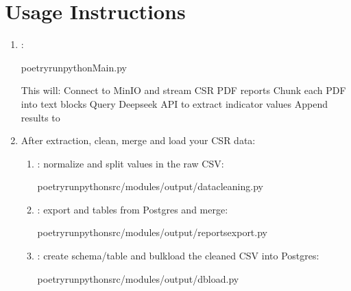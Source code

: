 \documentclass[letterpaper,10pt,english]{sphinxmanual}
\begin{document}
\sphinxstepscope


\chapter{Usage Instructions}
\label{\detokenize{usage_instructions:usage-instructions}}\label{\detokenize{usage_instructions::doc}}\begin{enumerate}
%
\item {} 
\sphinxAtStartPar
{}:

\begin{sphinxVerbatim}[commandchars=\\\{\}]
poetryrunpythonMain.py
\end{sphinxVerbatim}

\sphinxAtStartPar
This will:
\sphinxhyphen{} Connect to MinIO and stream CSR PDF reports
\sphinxhyphen{} Chunk each PDF into text blocks
\sphinxhyphen{} Query Deepseek API to extract indicator values
\sphinxhyphen{} Append results to 

\item {} 
\sphinxAtStartPar
{}

\sphinxAtStartPar
After extraction, clean, merge and load your CSR data:
\begin{enumerate}
%
\item {} 
\sphinxAtStartPar
{}: normalize and split values in the raw CSV:

\begin{sphinxVerbatim}[commandchars=\\\{\}]
poetryrunpythonsrc/modules/output/data\PYGZus{}cleaning.py
\end{sphinxVerbatim}

\item {} 
\sphinxAtStartPar
{}: export  and  tables from Postgres and merge:

\begin{sphinxVerbatim}[commandchars=\\\{\}]
poetryrunpythonsrc/modules/output/reports\PYGZus{}export.py
\end{sphinxVerbatim}

\item {} 
\sphinxAtStartPar
{}: create schema/table and bulk\sphinxhyphen{}load the cleaned CSV into Postgres:

\begin{sphinxVerbatim}[commandchars=\\\{\}]
poetryrunpythonsrc/modules/output/db\PYGZus{}load.py
\end{sphinxVerbatim}

\end{enumerate}

\end{enumerate}
\end{document}
